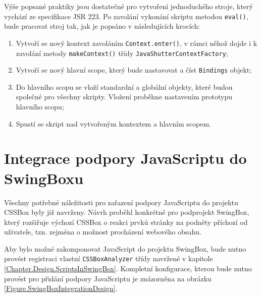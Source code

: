 Výše popsané praktiky jsou dostatečné pro vytvoření jednoduchého stroje, který vychází ze specifikace JSR 223.  Po zavolání vykonání skriptu metodou \texttt{eval()}, bude pracovat stroj tak, jak je popsáno v následujících krocích:  

\begin{enumerate}
  \item	Vytvoří se nový kontext zavoláním \texttt{Context.enter()}, v rámci něhož dojde i k zavolání metody \texttt{makeContext()} třídy \texttt{JavaShutterContextFactory};
  \item	Vytvoří se nový hlavní scope, který bude nastavovat a číst \texttt{Bindings} objekt;
  \item	Do hlavního scopu se vloží standardní a globální objekty, které budou společné pro všechny skripty. Vložení proběhne nastavením prototypu hlavního scopu;
  \item	Spustí se skript nad vytvořeným kontextem a hlavním scopem.
\end{enumerate}

\section{Integrace podpory JavaScriptu do SwingBoxu}
\label{Chapter.Design.SwingBoxIntegration}

Všechny potřebné náležitosti pro zařazení podpory JavaScriptu do projektu CSSBox byly již navrženy. Návrh proběhl konkrétně pro podprojekt SwingBox, který rozšiřuje výchozí  CSSBox o reakci prvků stránky na podněty příchozí od uživatele, tzn. zejména o možnost procházení webového obsahu. 

Aby bylo možné zakomponovat JavaScript do projektu SwingBox, bude nutno provést registraci vlastní \texttt{CSSBoxAnalyzer} třídy navržené v kapitole \ref{Chapter.Design.ScriptsInSwingBox}. Kompletní konfigurace, kterou bude nutno provést pro přidání podpory JavaScriptu je znázorněna na obrázku \ref{Figure.SwingBoxIntegrationDesign}.

